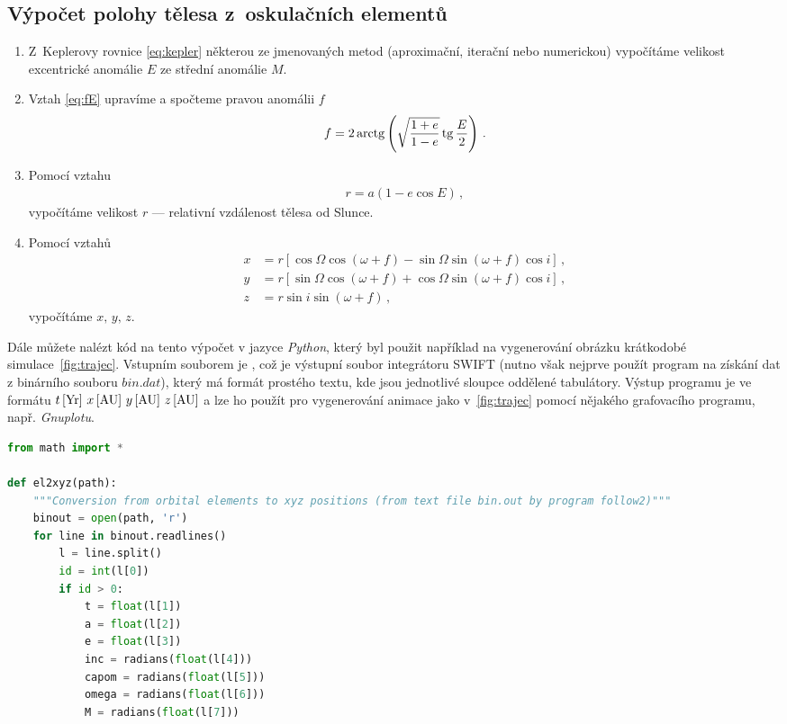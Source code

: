 \documentclass[A4paper, 12pt, oneside]{book}
\begin{document}
\begin{appendices}
	\chapter{Výpočet polohy tělesa z~oskulačních elementů} \label{app:el2xyz}
\begin{enumerate}[label=\arabic*.]
	\item Z~Keplerovy rovnice \eqref{eq:kepler} některou ze jmenovaných metod (aproximační, iterační nebo numerickou) vypočítáme velikost excentrické anomálie $E$ ze střední anomálie $M$.
	\item Vztah \eqref{eq:fE} upravíme a spočteme pravou anomálii $f$
		\begin{align}
			f = 2\operatorname{arctg}\left(\sqrt{\frac{1+e}{1-e}}\operatorname{tg} \frac{E}{2}\right)\,.
		\end{align}
	\item Pomocí vztahu 
\vspace{-12pt}
		\begin{align}
			r=a(1-e\cos E)\,,
		\end{align}
		vypočítáme velikost $r$ --- relativní vzdálenost tělesa od Slunce.
	\item Pomocí vztahů
\vspace{-12pt}
		\begin{align}
			x&=r\left[\cos\Omega\cos(\omega+f)-\sin\Omega\sin(\omega+f)\cos i\right]\,, \\
			y&=r\left[\sin\Omega\cos(\omega+f)+\cos\Omega\sin(\omega+f)\cos i\right]\,, \\
			z&=r\sin i\sin(\omega+f)\,,
		\end{align}
		vypočítáme $x,\,y,\,z$.
\end{enumerate}

	Dále můžete nalézt kód na tento výpočet v jazyce \textit{Python}, který byl použit například na vygenerování obrázku krátkodobé simulace~\ref{fig:trajec}. Vstupním souborem je , což je výstupní soubor integrátoru SWIFT (nutno však nejprve použít program  na získání dat z binárního souboru $bin.dat$), který má formát prostého textu, kde jsou jednotlivé sloupce oddělené tabulátory. Výstup programu je ve formátu $t\,[{\rm Yr}]\ x\,[{\rm AU}]\ y\,[{\rm AU}]\ z\,[{\rm AU}]$ a lze ho použít pro vygenerování animace jako v~\ref{fig:trajec} pomocí nějakého grafovacího programu, např. \textit{Gnuplotu}.
	\begin{lstlisting}[language=Python]
from math import *

def el2xyz(path):
    """Conversion from orbital elements to xyz positions (from text file bin.out by program follow2)"""
    binout = open(path, 'r')
    for line in binout.readlines()
        l = line.split()
        id = int(l[0])
        if id > 0:
            t = float(l[1])
            a = float(l[2])
            e = float(l[3])
            inc = radians(float(l[4]))
            capom = radians(float(l[5]))
            omega = radians(float(l[6]))
            M = radians(float(l[7]))
    

\end{lstlisting}
\end{appendices}
\end{document}
